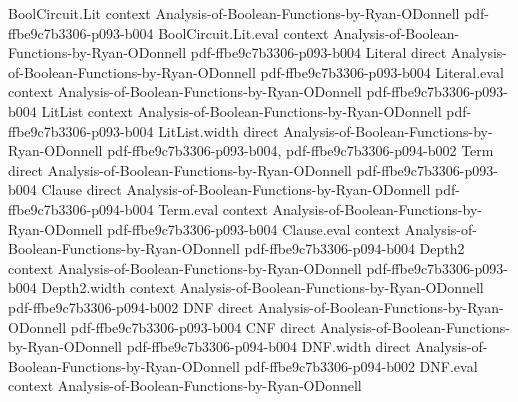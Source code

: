 \begin{lemma}
\label{RestrictionFourier.sum_tail_expectation_eq}
\leanok
{}
\proofstep
  {BoolCircuit.Lit}
  {context}
  {Analysis-of-Boolean-Functions-by-Ryan-ODonnell}
  {pdf-ffbe9c7b3306-p093-b004}
\proofstep
  {BoolCircuit.Lit.eval}
  {context}
  {Analysis-of-Boolean-Functions-by-Ryan-ODonnell}
  {pdf-ffbe9c7b3306-p093-b004}
\proofstep
  {Literal}
  {direct}
  {Analysis-of-Boolean-Functions-by-Ryan-ODonnell}
  {pdf-ffbe9c7b3306-p093-b004}
\proofstep
  {Literal.eval}
  {context}
  {Analysis-of-Boolean-Functions-by-Ryan-ODonnell}
  {pdf-ffbe9c7b3306-p093-b004}
\proofstep
  {LitList}
  {context}
  {Analysis-of-Boolean-Functions-by-Ryan-ODonnell}
  {pdf-ffbe9c7b3306-p093-b004}
\proofstep
  {LitList.width}
  {direct}
  {Analysis-of-Boolean-Functions-by-Ryan-ODonnell}
  {pdf-ffbe9c7b3306-p093-b004,
    pdf-ffbe9c7b3306-p094-b002}
\proofstep
  {Term}
  {direct}
  {Analysis-of-Boolean-Functions-by-Ryan-ODonnell}
  {pdf-ffbe9c7b3306-p093-b004}
\proofstep
  {Clause}
  {direct}
  {Analysis-of-Boolean-Functions-by-Ryan-ODonnell}
  {pdf-ffbe9c7b3306-p094-b004}
\proofstep
  {Term.eval}
  {context}
  {Analysis-of-Boolean-Functions-by-Ryan-ODonnell}
  {pdf-ffbe9c7b3306-p093-b004}
\proofstep
  {Clause.eval}
  {context}
  {Analysis-of-Boolean-Functions-by-Ryan-ODonnell}
  {pdf-ffbe9c7b3306-p094-b004}
\proofstep
  {Depth2}
  {context}
  {Analysis-of-Boolean-Functions-by-Ryan-ODonnell}
  {pdf-ffbe9c7b3306-p093-b004}
\proofstep
  {Depth2.width}
  {context}
  {Analysis-of-Boolean-Functions-by-Ryan-ODonnell}
  {pdf-ffbe9c7b3306-p094-b002}
\proofstep
  {DNF}
  {direct}
  {Analysis-of-Boolean-Functions-by-Ryan-ODonnell}
  {pdf-ffbe9c7b3306-p093-b004}
\proofstep
  {CNF}
  {direct}
  {Analysis-of-Boolean-Functions-by-Ryan-ODonnell}
  {pdf-ffbe9c7b3306-p094-b004}
\proofstep
  {DNF.width}
  {direct}
  {Analysis-of-Boolean-Functions-by-Ryan-ODonnell}
  {pdf-ffbe9c7b3306-p094-b002}
\proofstep
  {DNF.eval}
  {context}
  {Analysis-of-Boolean-Functions-by-Ryan-ODonnell}

\end{lemma}
